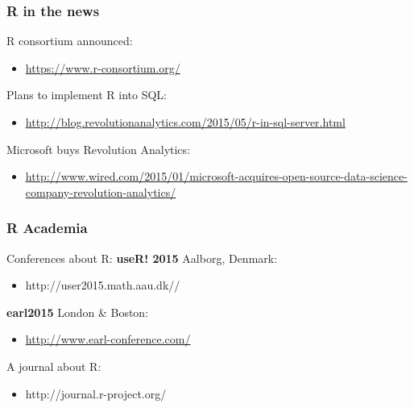 \documentclass[xcolor=dvipsnames]{beamer}
\begin{document}
\begin{frame}
\frametitle{R in the news}
R consortium announced:
\begin{itemize}
\item \tiny \url{https://www.r-consortium.org/}
\newline
\end{itemize}

Plans to implement R into SQL:
\begin{itemize}
\item \tiny \url{http://blog.revolutionanalytics.com/2015/05/r-in-sql-server.html}
\newline
\end{itemize}

Microsoft buys Revolution Analytics:
\begin{itemize}
\item \tiny \url{http://www.wired.com/2015/01/microsoft-acquires-open-source-data-science-company-revolution-analytics/}
\newline
\end{itemize}

\end{frame}




\begin{frame}
\frametitle{R Academia}
\begin{block}{Conferences about R:}
\textbf{useR! 2015} Aalborg, Denmark: \begin{itemize}
 \item http://user2015.math.aau.dk// 
 \newline
 \end{itemize}

\textbf{earl2015} London \& Boston: \begin{itemize}
\item \url{http://www.earl-conference.com/}
\newline
\end{itemize}
\end{block}

\begin{block}{A journal about R:}
\begin{itemize}
\item http://journal.r-project.org/
\end{itemize}
\end{block}
\end{frame}
\end{document}
